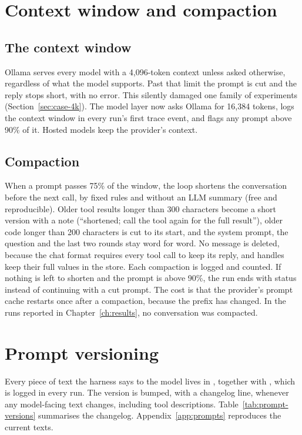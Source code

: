 \section{Context window and compaction}

\subsection{The context window}

Ollama serves every model with a 4,096-token context unless asked otherwise, regardless of what the model supports.
Past that limit the prompt is cut and the reply stops short, with no error. This silently damaged one family of
experiments (Section~\ref{sec:case-4k}). The model layer now asks Ollama for 16,384 tokens, logs the context window in
every run's first trace event, and flags any prompt above 90\% of it. Hosted models keep the provider's context.

\subsection{Compaction}

When a prompt passes 75\% of the window, the loop shortens the conversation before the next call, by fixed rules and
without an LLM summary (free and reproducible). Older tool results longer than 300 characters become a short version
with a note (``shortened; call the tool again for the full result''), older  code longer than 200
characters is cut to its start, and the system prompt, the question and the last two rounds stay word for word. No
message is deleted, because the chat format requires every tool call to keep its reply, and handles keep their full
values in the store. Each compaction is logged and counted. If nothing is left to shorten and the prompt is above
90\%, the run ends with status  instead of continuing with a cut prompt. The cost is that the
provider's prompt cache restarts once after a compaction, because the prefix has changed. In the runs reported in
Chapter~\ref{ch:results}, no conversation was compacted.

\section{Prompt versioning}

Every piece of text the harness says to the model lives in , together with
, which is logged in every run. The version is bumped, with a changelog line, whenever any
model-facing text changes, including tool descriptions. Table~\ref{tab:prompt-versions} summarises the changelog.
Appendix~\ref{app:prompts} reproduces the current texts.

